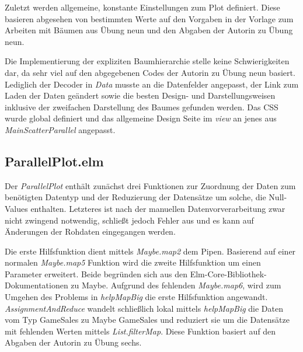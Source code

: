 \documentclass[usegeometry=true]{scrartcl}
\begin{document}
Zuletzt werden allgemeine, konstante Einstellungen zum Plot definiert. 
Diese basieren abgesehen von bestimmten Werte auf den Vorgaben in der Vorlage zum Arbeiten mit Bäumen aus Übung neun 
und den Abgaben der Autorin zu Übung neun. 

Die Implementierung der expliziten Baumhierarchie stelle keine Schwierigkeiten dar, 
da sehr viel auf den abgegebenen Codes der Autorin zu Übung neun basiert. 
Lediglich der Decoder in \textit{Data} musste an die Datenfelder angepasst, der Link zum Laden der Daten geändert 
sowie die besten Design- und Darstellungsweisen inklusive der zweifachen Darstellung des Baumes gefunden werden. 
Das CSS wurde global definiert und das allgemeine Design Seite im \textit{view} an jenes aus \textit{MainScatterParallel} angepasst. 

\subsection{ParallelPlot.elm}
Der \textit{ParallelPlot} enthält zunächst drei Funktionen zur Zuordnung der Daten zum benötigten Datentyp und der Reduzierung der Datensätze um solche, 
die Null-Values enthalten. 
Letzteres ist nach der manuellen Datenvorverarbeitung zwar nicht zwingend notwendig, 
schließt jedoch Fehler aus und es kann auf Änderungen der Rohdaten eingegangen werden. 

Die erste Hilfsfunktion dient mittels \textit{Maybe.map2} dem Pipen.
Basierend auf einer normalen \textit{Maybe.map5} Funktion wird die zweite Hilfsfunktion um einen Parameter erweitert. 
Beide begründen sich aus den Elm-Core-Bibliothek-Dokumentationen zu Maybe.\cite{EvanCzaplicki.o.J.} 
Aufgrund des fehlenden \textit{Maybe.map6}, wird zum Umgehen des Problems in \textit{helpMapBig} die erste Hilfsfunktion angewandt. 
\textit{AssignmentAndReduce} wandelt schließlich lokal mittels \textit{helpMapBig} die Daten vom Typ GameSales zu Maybe GameSales 
und reduziert sie um die Datensätze mit fehlenden Werten mittels \textit{List.filterMap}.
Diese Funktion basiert auf den Abgaben der Autorin zu Übung sechs.
\end{document}
